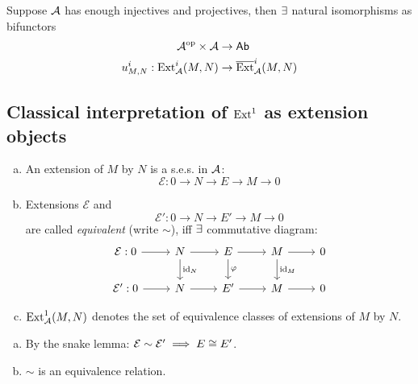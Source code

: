 \documentclass[a4paper]{report}
\begin{document}
\begin{thm}Suppose $\mathcal{A}$ has enough injectives and projectives, then $\exists$ natural isomorphisms as bifunctors \begin{align*}
  \mathcal{A}^\mathrm{op} \times \mathcal{A} &\to \mathsf{Ab} \\
               u^{i}_{M,N}: \operatorname{Ext}_{\mathcal{A}}^{i}(M,N) &\to \overline {\operatorname{Ext}}_{\mathcal{A}}^{i}(M,N)
\end{align*}
\end{thm}
\subsection{Classical interpretation of $\operatorname{Ext}^{1}$ as extension objects}
\begin{defi}
\begin{enumerate}[(a)]
  \item An extension of $M$ by $N$ is a s.e.s. in $\mathcal{A}$:\[\mathcal E: 0 \to N \to E \to M \to 0\]
  \item Extensions $\mathcal E$ and
        \[\mathcal E': 0 \to N \to E' \to M \to 0\]
        are called \emph{equivalent} (write $\sim$), iff $\exists$ commutative diagram:
        \[\begin{tikzcd}
\mathcal E: 0 \arrow[r]  & N \arrow[r] \arrow[d, "\mathrm{id}_N"] & E \arrow[r] \arrow[d, "\varphi"] & M \arrow[r] \arrow[d, "\mathrm{id}_M"] & 0 \\
\mathcal E': 0 \arrow[r] & N \arrow[r]                            & E' \arrow[r]                     & M \arrow[r]                            & 0
\end{tikzcd}\]
  \item $\operatorname{Ext}_{\mathcal{A}}^{1}(M,N)$ denotes the set of equivalence classes of extensions of $M$ by $N$.
\end{enumerate}
\end{defi}

\begin{rem*}
  \begin{enumerate}[(a)]
    \item By the snake lemma: $\mathcal E \sim \mathcal E' \implies E \cong E'$.
          \item $\sim$ is an equivalence relation.
  \end{enumerate}
\end{rem*}
\end{document}
